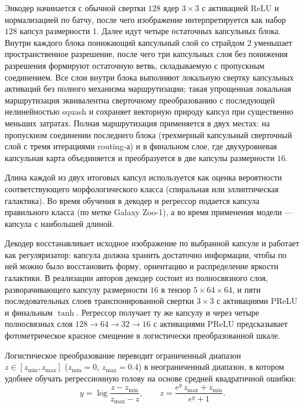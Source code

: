 \documentclass[12pt,a4paper]{article}
\begin{document}
Энкодер начинается с обычной свертки $128$ ядер $3 \times 3$ с активацией ReLU и нормализацией по батчу, после чего изображение интерпретируется как набор $128$ капсул размерности $1$. Далее идут четыре остаточных капсульных блока. Внутри каждого блока понижающий капсульный слой со страйдом $2$ уменьшает пространственное разрешение, после чего три капсульных слоя без понижения разрешения формируют остаточную ветвь, складываемую с пропускным соединением. Все слои внутри блока выполняют локальную свертку капсульных активаций без полного механизма маршрутизации; такая упрощенная локальная маршрутизация эквивалентна сверточному преобразованию с последующей нелинейностью squash и сохраняет векторную природу капсул при существенно меньших затратах. Полная маршрутизация применяется в двух местах: на пропускном соединении последнего блока (трехмерный капсульный сверточный слой с тремя итерациями routing-а) и в финальном слое, где двухуровневая капсульная карта объединяется и преобразуется в две капсулы размерности $16$.

Длина каждой из двух итоговых капсул используется как оценка вероятности соответствующего морфологического класса (спиральная или эллиптическая галактика). Во время обучения в декодер и регрессор подается капсула правильного класса (по метке Galaxy Zoo-1), а во время применения модели — капсула с наибольшей длиной.

Декодер восстанавливает исходное изображение по выбранной капсуле и работает как регуляризатор: капсула должна хранить достаточно информации, чтобы по ней можно было восстановить форму, ориентацию и распределение яркости галактики. В реализации авторов декодер состоит из полносвязного слоя, разворачивающего капсулу размерности $16$ в тензор $5 \times 64 \times 64$, и пяти последовательных слоев транспонированной свертки $3 \times 3$ с активациями PReLU и финальным $\tanh$. Регрессор получает ту же капсулу и через четыре полносвязных слоя $128 \to 64 \to 32 \to 16$ с активациями PReLU предсказывает фотометрическое красное смещение в логистически преобразованной шкале.

Логистическое преобразование переводит ограниченный диапазон $z \in [z_{\min}, z_{\max}]$ ($z_{\min} = 0$, $z_{\max} = 0.4$) в неограниченный диапазон, в котором удобнее обучать регрессионную голову на основе средней квадратичной ошибки:
\begin{equation}
y = \log\frac{z - z_{\min}}{z_{\max} - z}, \qquad
z = \frac{e^{y}\, z_{\max} + z_{\min}}{e^{y} + 1}.
\end{equation}
\end{document}
